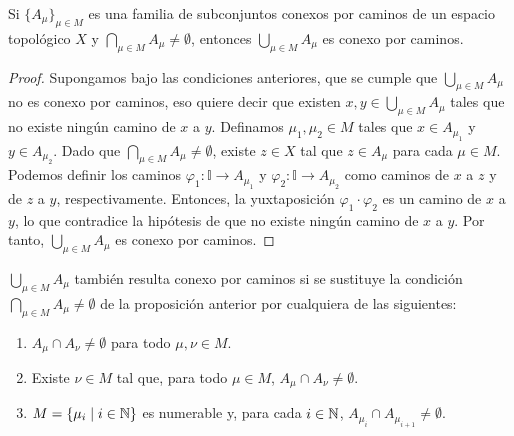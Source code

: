 \begin{proposición}
    Si $\{A_\mu\}_{\mu \in M}$ es una familia de subconjuntos conexos por caminos de un espacio topológico $X$ y $\bigcap_{\mu \in M} A_\mu \neq \emptyset$, entonces $\bigcup_{\mu \in M} A_\mu$ es conexo por caminos.
\end{proposición}
\begin{proof}
    Supongamos bajo las condiciones anteriores, que se cumple que $\bigcup_{\mu \in M} A_{\mu}$ no es conexo por caminos, eso quiere decir que existen $x, y \in \bigcup_{\mu \in M} A_{\mu}$ tales que no existe ningún camino de $x$ a $y$. Definamos $\mu_1, \mu_2 \in M$ tales que $x \in A_{\mu_1}$ y $y \in A_{\mu_2}$. Dado que $\bigcap_{\mu \in M} A_\mu \neq \emptyset$, existe $z \in X$ tal que $z \in A_\mu$ para cada $\mu \in M$. Podemos definir los caminos $\varphi_1 \colon \mathbb{I} \to A_{\mu_1}$ y $\varphi_2 \colon \mathbb{I} \to A_{\mu_2}$ como caminos de $x$ a $z$ y de $z$ a $y$, respectivamente. Entonces, la yuxtaposición $\varphi_1 \cdot \varphi_2$ es un camino de $x$ a $y$, lo que contradice la hipótesis de que no existe ningún camino de $x$ a $y$. Por tanto, $\bigcup_{\mu \in M} A_\mu$ es conexo por caminos.
\end{proof}
\begin{proposición}
    $\bigcup_{\mu \in M} A_\mu$ también resulta conexo por caminos si se sustituye la condición $\bigcap_{\mu \in M} A_\mu \neq \emptyset$ de la proposición anterior por cualquiera de las siguientes:
    \begin{enumerate}[label=\alph*)]
        \item $A_\mu \cap A_\nu \neq \emptyset$ para todo $\mu, \nu \in M$.
        \item Existe $\nu \in M$ tal que, para todo $\mu \in M$, $A_\mu \cap A_\nu \neq \emptyset$.
        \item $M = \{\mu_i \mid i \in \mathbb{N}\}$ es numerable y, para cada $i \in \mathbb{N}$, $A_{\mu_i} \cap A_{\mu_{i+1}} \neq \emptyset$.
    \end{enumerate}
\end{proposición}

